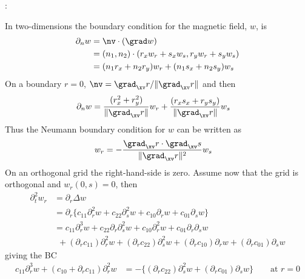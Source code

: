 :

In two-dimensions the boundary condition for the magnetic field, $w$, is
\begin{align*}
    \partial_n w & = \nv\cdot(\grad w) \\
                 & = (n_1,n_2)\cdot(r_x w_r + s_x w_s, r_y w_r + s_y w_s ) \\
                 & = (n_1 r_x + n_2 r_y ) w_r + (n_1 s_x + n_2 s_y ) w_s 
\end{align*}
On a boundary $r=0$, $\nv=\grad_\xv r/\| \grad_\xv r \|$ and then
\begin{align*}
  \partial_n w & = {(r_x^2 + r_y^2) \over \| \grad_\xv r \|} w_r + {(r_x s_x + r_y s_y )\over \| \grad_\xv r \|}  w_s 
\end{align*}
Thus the Neumann boundary condition for $w$ can be written as 
\begin{align*}
  w_r &= - {\grad_\xv r\cdot\grad_\xv s \over   \| \grad_\xv r \|^2 } w_s 
\end{align*}
On an orthogonal grid the right-hand-side is zero.
Assume now that the grid is orthogonal and $w_r(0,s)=0$, then 
\begin{align*}
  \partial_t^2 w_r &= \partial_r\Delta w \\
   &= \partial_r\big\{ c_{11} \partial_r^2 w+ c_{22}\partial_s^2 w+ c_{10} \partial_r w+ c_{01} \partial_s w\big\}\\
   &= c_{11} \partial_r^3 w+ c_{22}\partial_r\partial_s^2 w+ c_{10} \partial_r^2 w+ c_{01} \partial_r\partial_s w \\
   &~~+ (\partial_r c_{11}) \partial_r^2 w+ (\partial_r c_{22})\partial_s^2 w
      + (\partial_r c_{10}) \partial_r w+ (\partial_r c_{01}) \partial_s w
\end{align*}
giving the BC
\begin{align*}
c_{11} \partial_r^3 w + (c_{10}+\partial_r c_{11})\partial_r^2 w &=
   -\big\{ (\partial_r c_{22})\partial_s^2 w + (\partial_r c_{01}) \partial_s w \big\} \qquad\mbox{at $r=0$}
\end{align*}



